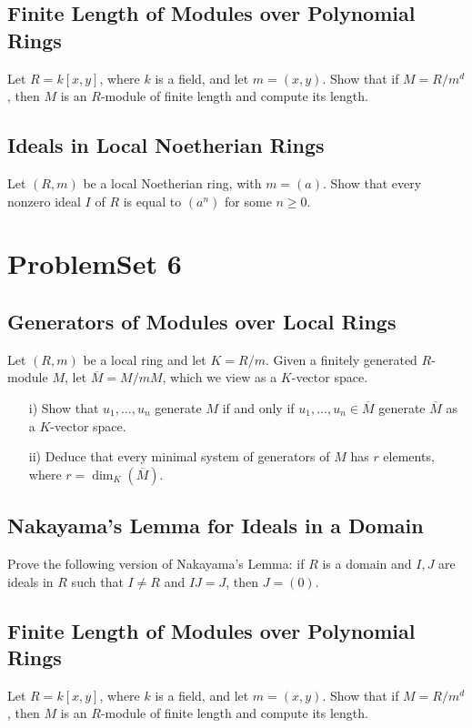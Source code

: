 \documentclass[lang=cn,11pt]{template}
\begin{document}
\section{Finite Length of Modules over Polynomial Rings}
Let \( R = k[x, y] \), where \( k \) is a field, and let \( m = (x, y) \). Show that if \( M = R/m^d \), then \( M \) is an \( R \)-module of finite length and compute its length.

\section{Ideals in Local Noetherian Rings}
Let \( (R, m) \) be a local Noetherian ring, with \( m = (a) \). Show that every nonzero ideal \( I \) of \( R \) is equal to \( (a^n) \) for some \( n \geq 0 \).









\chapter{ProblemSet 6}

\section{Generators of Modules over Local Rings}
Let \( (R, m) \) be a local ring and let \( K = R/m \). Given a finitely generated \( R \)-module \( M \), let \( \overline{M} = M/mM \), which we view as a \( K \)-vector space.
\begin{itemize}
    \item[i)] Show that \( u_1, \dots, u_n \) generate \( M \) if and only if \( u_1, \dots, u_n \in \overline{M} \) generate \( \overline{M} \) as a \( K \)-vector space.
    \item[ii)] Deduce that every minimal system of generators of \( M \) has \( r \) elements, where \( r = \dim_K(\overline{M}) \).
\end{itemize}

\section{Nakayama's Lemma for Ideals in a Domain}
Prove the following version of Nakayama’s Lemma: if \( R \) is a domain and \( I, J \) are ideals in \( R \) such that \( I \neq R \) and \( IJ = J \), then \( J = (0) \).

\section{Finite Length of Modules over Polynomial Rings}
Let \( R = k[x, y] \), where \( k \) is a field, and let \( m = (x, y) \). Show that if \( M = R/m^d \), then \( M \) is an \( R \)-module of finite length and compute its length.
\end{document}
